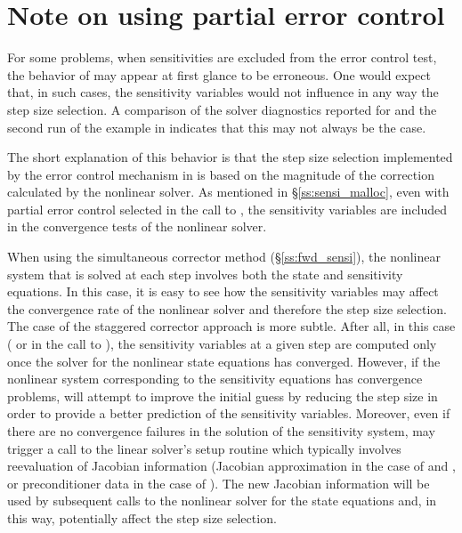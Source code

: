 \section{Note on using partial error control}\label{ss:partial}
For some problems, when sensitivities are excluded from the error control test, 
the behavior of {\cvodes} may appear at first glance to be erroneous. One would
expect that, in such cases, the sensitivity variables would not influence in
any way the step size selection. A comparison of the solver diagnostics 
reported for  and the second run of the  example 
in \cite{cvodes2.1.0_ex} indicates that this may not always be the case.

The short explanation of this behavior is that the step size selection
implemented by the error control mechanism in {\cvodes} is based on the 
magnitude of the correction calculated by the nonlinear solver. As mentioned
in \S\ref{ss:sensi_malloc}, even with partial error control selected
in the call to , the sensitivity variables are included
in the convergence tests of the nonlinear solver.

When using the simultaneous corrector method (\S\ref{ss:fwd_sensi}),
the nonlinear system that is solved at each step involves both the state
and sensitivity equations. In this case, it is easy to see how the sensitivity 
variables may affect the convergence rate of the nonlinear solver and therefore
the step size selection. 
The case of the staggered corrector approach is more subtle. 
After all, in this case ( or  in the call 
to ), the sensitivity variables at a given step are 
computed only once the solver for the nonlinear state equations has converged.
However, if the nonlinear system corresponding to the sensitivity equations
has convergence problems, {\cvodes} will attempt to improve the initial guess
by reducing the step size in order to provide a better prediction of the
sensitivity variables. Moreover, even if there are no convergence failures in
the solution of the sensitivity system, {\cvodes} may trigger a call to the
linear solver's setup routine which typically involves reevaluation of Jacobian
information (Jacobian approximation in the case of {\cvdense} and {\cvband}, or
preconditioner data in the case of {\cvspgmr}). The new Jacobian information
will be used by subsequent calls to the nonlinear solver for the state equations
and, in this way, potentially affect the step size selection.

